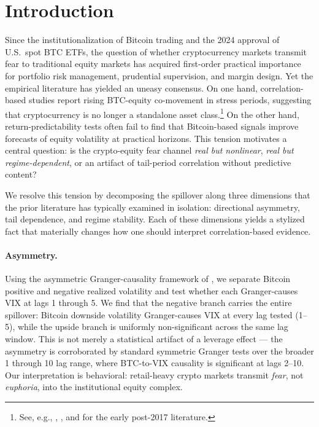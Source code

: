 \documentclass[11pt,a4paper]{article}
\begin{document}
\section{Introduction}

Since the institutionalization of Bitcoin trading and the 2024 approval of U.S.\ spot BTC ETFs, the question of whether cryptocurrency markets transmit fear to traditional equity markets has acquired first-order practical importance for portfolio risk management, prudential supervision, and margin design. Yet the empirical literature has yielded an uneasy consensus. On one hand, correlation-based studies report rising BTC-equity co-movement in stress periods, suggesting that cryptocurrency is no longer a standalone asset class.\footnote{See, e.g., \citet{bouri2020}, \citet{corbet2018}, and \citet{matkovskyy2019} for the early post-2017 literature.} On the other hand, return-predictability tests often fail to find that Bitcoin-based signals improve forecasts of equity volatility at practical horizons. This tension motivates a central question: is the crypto-equity fear channel \emph{real but nonlinear}, \emph{real but regime-dependent}, or an artifact of tail-period correlation without predictive content?

We resolve this tension by decomposing the spillover along three dimensions that the prior literature has typically examined in isolation: directional asymmetry, tail dependence, and regime stability. Each of these dimensions yields a stylized fact that materially changes how one should interpret correlation-based evidence.

\paragraph{Asymmetry.} Using the asymmetric Granger-causality framework of \citet{hatemi2012}, we separate Bitcoin positive and negative realized volatility and test whether each Granger-causes VIX at lags 1 through 5.%
 We find that the negative branch carries the entire spillover: Bitcoin downside volatility Granger-causes VIX at every lag tested (1--5), while the upside branch is uniformly non-significant across the same lag window. This is not merely a statistical artifact of a leverage effect --- the asymmetry is corroborated by standard symmetric Granger tests over the broader 1 through 10 lag range, where BTC-to-VIX causality is significant at lags 2--10.%
 Our interpretation is behavioral: retail-heavy crypto markets transmit \emph{fear}, not \emph{euphoria}, into the institutional equity complex.
\end{document}
